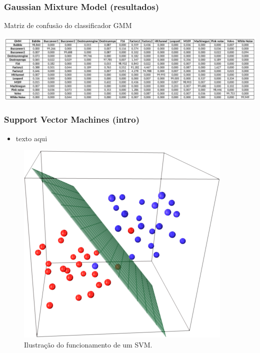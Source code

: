 \documentclass{beamer}
\begin{document}
\begin{frame}

	\frametitle{Gaussian Mixture Model (resultados)}
	
	\begin{table}[h]
		\centering
		\caption{Matriz de confusão do classificador GMM}
		\label{tab:confusion_gmm}
		\includegraphics[width=\textwidth]{conf_gmm.png}
	\end{table}
	
\end{frame}




\begin{frame}

	\frametitle{Support Vector Machines (intro)}
	
	\begin{minipage}{.45\textwidth}
	
		\begin{itemize}
			\item texto aqui
		\end{itemize}
	
	\end{minipage}
	\begin{minipage}{.5\textwidth}
		\begin{figure}
			\includegraphics[width=\linewidth]{svm01.png}
  			\caption{Ilustração do funcionamento de um SVM.}
  			\label{fig:svm1}
		\end{figure}
	\end{minipage}
	
\end{frame}
\end{document}

